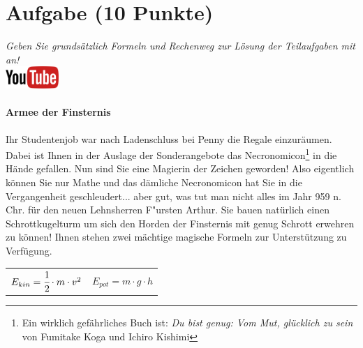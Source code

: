 \documentclass[a4paper, 10pt]{scrartcl}\usepackage[]{graphicx}\usepackage[]{xcolor}
\begin{document}
\clearpage\null
\clearpage\null 
\clearpage

\section{Aufgabe \hfill (10 Punkte)}

\textit{Geben Sie grunds{\"a}tzlich Formeln und Rechenweg zur L{\"o}sung der
  Teilaufgaben mit an!} \\[1Ex]

\hfill\href{https://youtu.be/Bbu6n8MXxQk}{\includegraphics[width =
  2cm]{img/youtube}} %
\hspace{2Ex}

\paragraph{Armee der Finsternis}



Ihr Studentenjob war nach Ladenschluss bei Penny die Regale
einzur{\"a}umen. Dabei ist Ihnen in der Auslage der Sonderangebote das
Necronomicon\footnote{Ein wirklich gef{\"a}hrliches Buch ist:
  \textit{Du bist genug: Vom Mut, gl{\"u}cklich zu sein} von Fumitake Koga und
  Ichiro Kishimi} in die H{\"a}nde gefallen. Nun sind Sie eine Magierin der
Zeichen geworden! Also eigentlich k{\"o}nnen Sie nur Mathe und das d{\"a}mliche
Necronomicon hat Sie in die Vergangenheit geschleudert... aber gut, was tut
man nicht alles im Jahr 959 n. Chr. f{\"u}r den neuen Lehnsherren
F{"u}rsten Arthur. Sie bauen nat{\"u}rlich einen Schrottkugelturm um sich den
Horden der Finsternis mit genug Schrott erwehren zu k{\"o}nnen! Ihnen stehen
zwei m{\"a}chtige magische Formeln zur Unterst{\"u}tzung zu Verf{\"u}gung.

\begin{center}
  \begin{tabular}{cc}
    $E_{kin} = \cfrac{1}{2}\cdot m \cdot v^2$ & $E_{pot} = m \cdot g \cdot h$\\
  \end{tabular}
\end{center}
\end{document}
